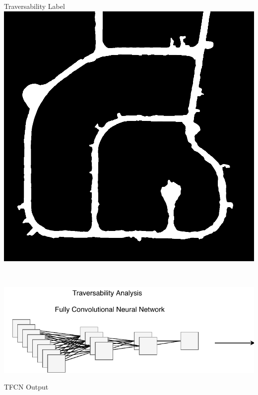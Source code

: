 \documentclass[usenames,dvipsnames,10pt]{beamer}
\begin{document}
\begin{frame}
\begin{minipage}[]{0.3\textwidth}
\end{minipage}
\hspace{0.25cm}
\begin{minipage}[]{0.3\textwidth}
\centering
Traversability Label
\includegraphics[width=\textwidth]{graphics/aerial02-trav.jpg}
\end{minipage} \\
\vspace{0.25cm}
\begin{minipage}[]{0.666\textwidth}
\includegraphics[width=\textwidth]{graphics/tfcn2.pdf}
\end{minipage}
\begin{minipage}[]{0.3\textwidth}
\centering
TFCN Output

\end{minipage}
\end{frame}
\end{document}
